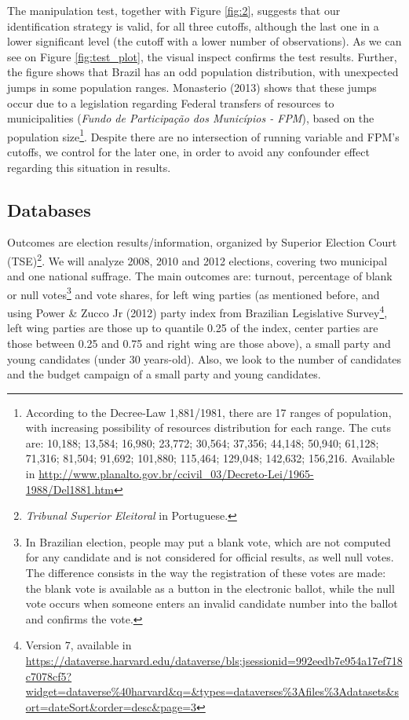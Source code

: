 \documentclass[
  12pt,
]{article}
\begin{document}
The manipulation test, together with Figure \ref{fig:2}, suggests that
our identification strategy is valid, for all three cutoffs, although
the last one in a lower significant level (the cutoff with a lower
number of observations). As we can see on Figure \ref{fig:test_plot},
the visual inspect confirms the test results. Further, the figure shows
that Brazil has an odd population distribution, with unexpected jumps in
some population ranges. Monasterio (2013) shows that these jumps occur
due to a legislation regarding Federal transfers of resources to
municipalities (\emph{Fundo de Participação dos Municípios - FPM}),
based on the population size\footnote{According to the Decree-Law
  1,881/1981, there are 17 ranges of population, with increasing
  possibility of resources distribution for each range. The cuts are:
  10,188; 13,584; 16,980; 23,772; 30,564; 37,356; 44,148; 50,940;
  61,128; 71,316; 81,504; 91,692; 101,880; 115,464; 129,048; 142,632;
  156,216. Available in
  \url{http://www.planalto.gov.br/ccivil_03/Decreto-Lei/1965-1988/Del1881.htm}}.
Despite there are no intersection of running variable and FPM's cutoffs,
we control for the later one, in order to avoid any confounder effect
regarding this situation in results.

\hypertarget{databases}{%
\subsection{Databases}\label{databases}}

Outcomes are election results/information, organized by Superior
Election Court (TSE)\footnote{\emph{Tribunal Superior Eleitoral} in
  Portuguese.}. We will analyze 2008, 2010 and 2012 elections, covering
two municipal and one national suffrage. The main outcomes are: turnout,
percentage of blank or null votes\footnote{In Brazilian election, people
  may put a blank vote, which are not computed for any candidate and is
  not considered for official results, as well null votes. The
  difference consists in the way the registration of these votes are
  made: the blank vote is available as a button in the electronic
  ballot, while the null vote occurs when someone enters an invalid
  candidate number into the ballot and confirms the vote.} and vote
shares, for left wing parties (as mentioned before, and using Power \&
Zucco Jr (2012) party index from Brazilian Legislative
Survey\footnote{Version 7, available in
  \url{https://dataverse.harvard.edu/dataverse/bls;jsessionid=992eedb7e954a17ef718c7078cf5?widget=dataverse\%40harvard\&q=\&types=dataverses\%3Afiles\%3Adatasets\&sort=dateSort\&order=desc\&page=3}},
left wing parties are those up to quantile 0.25 of the index, center
parties are those between 0.25 and 0.75 and right wing are those above),
a small party and young candidates (under 30 years-old). Also, we look
to the number of candidates and the budget campaign of a small party and
young candidates.
\end{document}
